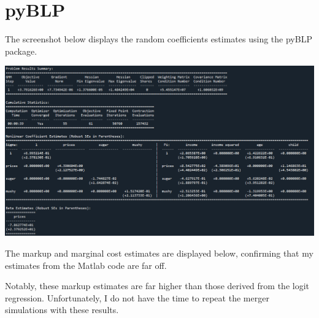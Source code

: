 \documentclass{article}
\begin{document}

\section{pyBLP}

The screenshot below displays the random coefficients estimates using the pyBLP package.
\begin{center}
        \includegraphics[scale = .5]{figure1.png}
\end{center}
The markup and marginal cost estimates are displayed below, confirming that my estimates from the Matlab code are far off.
\begin{center}
        
\end{center}
Notably, these markup estimates are far higher than those derived from the logit regression. Unfortunately, I do not have the time to repeat the merger simulations with these results.
\end{document}

